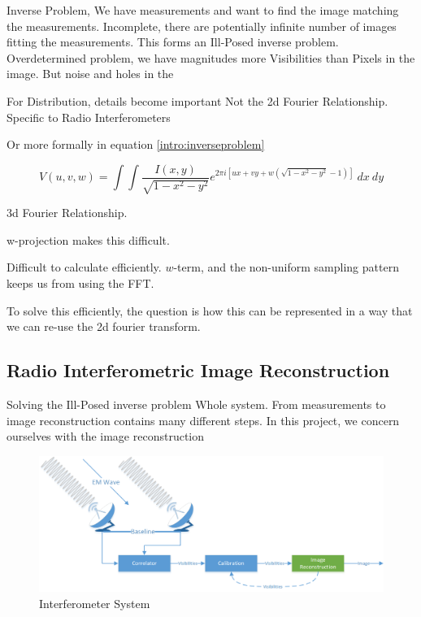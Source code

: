 Inverse Problem, We have measurements and want to find the image matching the measurements. Incomplete, there are potentially infinite number of images fitting 
the measurements. This forms an Ill-Posed inverse problem. 
Overdetermined problem, we have magnitudes more Visibilities than Pixels in the image. But noise and holes in the 

For Distribution, details become important
Not the 2d Fourier Relationship.
Specific to Radio Interferometers


Or more formally in equation \eqref{intro:inverseproblem}


\begin{equation}\label{intro:inverseproblem}
V(u, v, w) = \int\int \frac{I(x, y)}{\sqrt{1 - x^2 - y ^2}} e^{2 \pi i [ux+vy+ w(\sqrt{1 - x^2 - y ^2} - 1)]} \: dx \: dy
\end{equation}

3d Fourier Relationship.

w-projection makes this difficult.

Difficult to calculate efficiently. $w$-term, and the non-uniform sampling pattern keeps us from using the FFT.

To solve this efficiently, the question is how this can be represented in a way that we can re-use the 2d fourier transform.



\subsection{Radio Interferometric Image Reconstruction}

Solving the Ill-Posed inverse problem
Whole system.
From measurements to image reconstruction contains many different steps. In this project, we concern ourselves with the image reconstruction

\begin{figure}[h]
	\centering
	\includegraphics[width=0.80\linewidth]{./chapters/01.intro/system.png}
	\caption{Interferometer System}
	\label{intro:system}
\end{figure}

